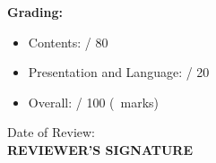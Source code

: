 \textbf{Grading:}
\begin{itemize}
    \item Contents: \dotfill / 80
    \item Presentation and Language: \dotfill / 20
    \item Overall: \dotfill / 100 (\dotfill\ marks)
\end{itemize}

\hspace{0.5\textwidth}Date of Review: \dotfill \\

\hspace{0.5\textwidth}\textbf{REVIEWER'S SIGNATURE} 